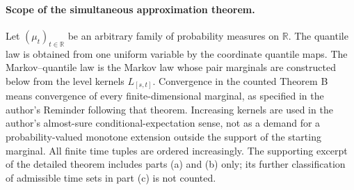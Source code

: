 \paragraph{Scope of the simultaneous approximation theorem.}
Let $(\mu_t)_{t\in\mathbb R}$ be an arbitrary family of probability measures on
$\mathbb R$. The quantile law is obtained from one uniform variable by the
coordinate quantile maps. The Markov--quantile law is the Markov law whose
pair marginals are constructed below from the level kernels $L_{[s,t]}$.
Convergence in the counted Theorem B means convergence of every finite-dimensional
marginal, as specified in the author's Reminder following that theorem.
Increasing kernels are used in the author's almost-sure conditional-expectation
sense, not as a demand for a probability-valued monotone extension outside the
support of the starting marginal. All finite time tuples are ordered increasingly.
The supporting excerpt of the detailed theorem includes parts (a) and (b) only;
its further classification of admissible time sets in part (c) is not counted.
